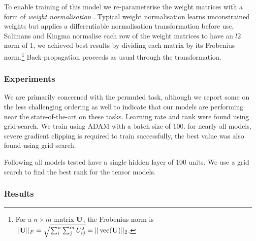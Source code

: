 To enable training of this model we re-parameterise the weight matrices with a
form of \emph{weight normalisation} \autocite{Salimans2016a}. Typical
weight normalisation learns unconstrained weights but applies a differentiable
normalisation transformation before use. Salimans and Kingma normalise each
row of the weight matrices to have an \(l2\) norm of \(1\), we achieved
best results by dividing each matrix by its Frobenius norm.\footnote{
For a \(n \times m\) matrix \(\mathbf{U}\), the Frobenius norm is
\(||\mathbf{U}||_F = \sqrt{\sum_i^n\sum_j^mU_{ij}^2} = ||\operatorname{vec}(\mathbf{U})||_2\).}
Back-propagation proceeds as usual through the transformation.

\subsubsection{Experiments}
We are primarily concerned with the permuted task, although we report some
on the less challenging ordering as well to indicate that our models are
performing near the state-of-the-art on these tasks. Learning rate and rank
were found using grid-search. We train using ADAM with a batch size of 100.
for nearly all models, severe gradient clipping \autocite{Pascanu2013} is
required to train successfully, the best value was also found using grid
search.

Following \autocite{Le2015} all models tested have a single hidden layer of 100 units.
We use a grid search to find the best rank for the tensor models.

\subsubsection{Results}

